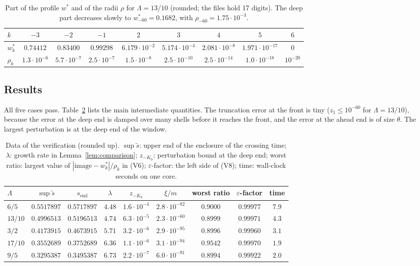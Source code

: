 \documentclass[12pt,reqno]{amsart}
\numberwithin{equation}{section}
\theoremstyle{plain}
\theoremstyle{definition}
\theoremstyle{remark}
\newcommand{\Kb}{K_{\mathrm b}}
\newcommand{\send}{s_{\mathrm{end}}}
\newcommand{\eps}{\varepsilon}
\begin{document}
\begin{table}[ht]
\centering\small
\caption{Part of the profile $w^*$ and of the radii $\rho$ for $\Lambda=13/10$
(rounded; the files hold 17 digits). The deep part decreases slowly to
$w^*_{-60}=0.1682$, with $\rho_{-60}=1.75\cdot10^{-3}$.}
\label{tab:profile}
\footnotesize\setlength{\tabcolsep}{4pt}
\begin{tabular}{@{}lcccccccc@{}}
\toprule
$k$ & $-3$ & $-2$ & $-1$ & $2$ & $3$ & $4$ & $5$ & $6$\\
\midrule
$w^*_k$ & $0.74412$ & $0.83400$ & $0.99298$ & $6.179\cdot10^{-2}$ & $5.174\cdot10^{-4}$ & $2.081\cdot10^{-8}$ & $1.971\cdot10^{-17}$ & $0$\\
$\rho_k$ & $1.3\cdot10^{-6}$ & $5.7\cdot10^{-7}$ & $2.5\cdot10^{-7}$ & $1.5\cdot10^{-8}$ & $2.5\cdot10^{-10}$ & $2.5\cdot10^{-14}$ & $1.0\cdot10^{-18}$ & $10^{-20}$\\
\bottomrule
\end{tabular}
\end{table}

\subsection{Results}
All five cases pass. Table~\ref{tab:verif} lists the main intermediate
quantities. The truncation error at the front is tiny ($z_1\le10^{-60}$
for $\Lambda=13/10$), because the error at the deep end is damped over many
shells before it reaches the front, and the error at the ahead end is of
size $\theta$. The largest perturbation is at the deep end of the window.

\begin{table}[ht]
\centering\small
\caption{Data of the verification (rounded up). $\sup\tilde s$: upper end of
the enclosure of the crossing time; $\lambda$: growth rate in Lemma~\ref{lem:comparison}; $z_{-\Kb}$:
perturbation bound at the deep end; worst ratio: largest value of
$|\text{image}-w^*_k|/\rho_k$ in (V6); $\eps$-factor: the left side of (V8);
time: wall-clock seconds on one core.}
\label{tab:verif}
\begin{tabular}{@{}lcccccccc@{}}
\toprule
$\Lambda$ & $\sup\tilde s$ & $\send$ & $\lambda$ & $z_{-\Kb}$ & $\xi/m$ & worst ratio & $\eps$-factor & time\\
\midrule
$6/5$   & $0.5517897$ & $0.5717897$ & $4.48$ & $1.6\cdot10^{-4}$ & $2.8\cdot10^{-82}$ & $0.9000$ & $0.99977$ & $7.9$\\
$13/10$ & $0.4996513$ & $0.5196513$ & $4.74$ & $6.3\cdot10^{-5}$ & $2.3\cdot10^{-60}$ & $0.8999$ & $0.99971$ & $4.3$\\
$3/2$   & $0.4173915$ & $0.4673915$ & $5.71$ & $3.2\cdot10^{-6}$ & $2.9\cdot10^{-95}$ & $0.8996$ & $0.99960$ & $3.1$\\
$17/10$ & $0.3552689$ & $0.3752689$ & $6.36$ & $1.1\cdot10^{-6}$ & $3.1\cdot10^{-94}$ & $0.9542$ & $0.99970$ & $1.9$\\
$9/5$   & $0.3295387$ & $0.3495387$ & $6.73$ & $2.2\cdot10^{-7}$ & $6.0\cdot10^{-91}$ & $0.8994$ & $0.99922$ & $2.0$\\
\bottomrule
\end{tabular}
\end{table}
\end{document}
